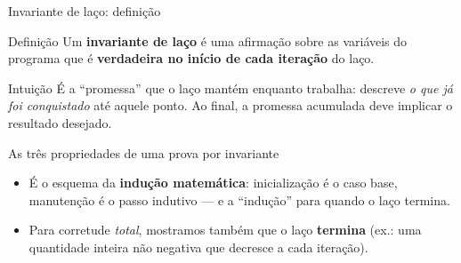 \documentclass[aspectratio=169]{beamer}
\begin{document}
\begin{frame}{Invariante de laço: definição}
  \begin{block}{Definição}
    Um \textbf{invariante de laço} é uma afirmação sobre as variáveis do programa que é
    \textbf{verdadeira no início de cada iteração} do laço.
  \end{block}
  \begin{exampleblock}{Intuição}
    É a ``promessa'' que o laço mantém enquanto trabalha: descreve \emph{o que já foi
    conquistado} até aquele ponto. Ao final, a promessa acumulada deve implicar o
    resultado desejado.
  \end{exampleblock}
\end{frame}

\begin{frame}{As três propriedades de uma prova por invariante}
  \begin{center}
  \end{center}
  \begin{itemize}
    \item É o esquema da \textbf{indução matemática}: inicialização é o caso base,
      manutenção é o passo indutivo --- e a ``indução'' para quando o laço termina.
    \item Para corretude \emph{total}, mostramos também que o laço \textbf{termina}
      (ex.: uma quantidade inteira não negativa que decresce a cada iteração).
  \end{itemize}
\end{frame}
\end{document}
